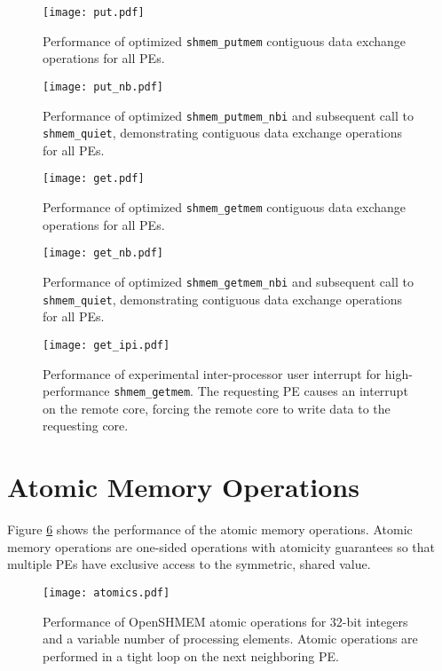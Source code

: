 \documentclass{article}
\begin{document}
\begin{figure}
	\centering
	\texttt{[image: put.pdf]}
	\caption{Performance of optimized \texttt{shmem\_putmem}
contiguous data exchange operations for all PEs.}
	\label{fig:put}
\end{figure}

\begin{figure}
	\centering
	\texttt{[image: put\_nb.pdf]}
	\label{fig:put_nb}
	\caption{Performance of optimized \texttt{shmem\_putmem\_nbi} and subsequent
call to \texttt{shmem\_quiet}, demonstrating contiguous data exchange
operations for all PEs.}
\end{figure}

\begin{figure}
	\centering
	\texttt{[image: get.pdf]}
	\caption{Performance of optimized \texttt{shmem\_getmem}
contiguous data exchange operations for all PEs.}
	\label{fig:get}
\end{figure}

\begin{figure}
	\centering
	\texttt{[image: get\_nb.pdf]}
	\caption{Performance of optimized \texttt{shmem\_getmem\_nbi} and subsequent
call to \texttt{shmem\_quiet}, demonstrating contiguous data exchange
operations for all PEs.}
	\label{fig:get_nb}
\end{figure}

\begin{figure}
	\centering
	\texttt{[image: get\_ipi.pdf]}
	\caption{Performance of experimental inter-processor user interrupt for
high-performance \texttt{shmem\_getmem}. The requesting PE causes an interrupt
on the remote core, forcing the remote core to write data to the requesting
core.}
	\label{fig:get_ipi}
\end{figure}

\section{Atomic Memory Operations} \label{sec:atomic}

Figure \ref{fig:atomics} shows the performance of the atomic memory operations.
Atomic memory operations are one-sided operations with atomicity guarantees so
that multiple PEs have exclusive access to the symmetric, shared value.

\begin{figure}
	\centering
	\texttt{[image: atomics.pdf]}
	\caption{Performance of \mbox{OpenSHMEM} atomic operations for 32-bit
integers and a variable number of processing elements. Atomic operations are
performed in a tight loop on the next neighboring PE.}
	\label{fig:atomics}
\end{figure}
\end{document}
